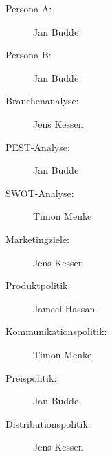 \begin{description}
\item[Persona A:] Jan Budde
\item[Persona B:] Jan Budde
\item[Branchenanalyse:] Jens Kessen 
\item[PEST-Analyse:] Jan Budde
\item[SWOT-Analyse:] Timon Menke
\item[Marketingziele:] Jens Kessen
\item[Produktpolitik:] Jameel Hassan
\item[Kommunikationspolitik:] Timon Menke
\item[Preispolitik:] Jan Budde
\item[Distributionspolitik:] Jens Kessen      
\end{description}
